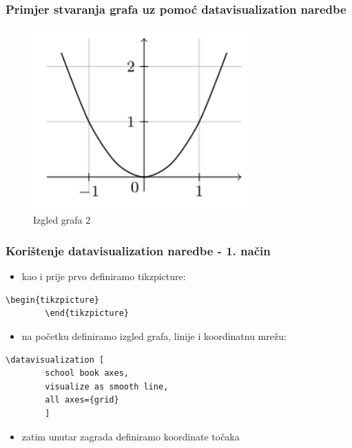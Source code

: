 \documentclass{beamer}
\begin{document}
	\begin{frame}
	\frametitle{Primjer stvaranja grafa uz pomoć datavisualization naredbe}
		\begin{figure}
			\begin{center}
				\includegraphics[width=12 cm,height=7cm]{graf_2.png}
				\caption{Izgled grafa 2}
			\end{center}
		\end{figure}
	\end{frame}

\begin{frame}[fragile]
	\frametitle{Korištenje datavisualization naredbe - 1. način}
		\begin{itemize}
			\item kao i prije prvo definiramo tikzpicture:
		\end{itemize} 
		\begin{verbatim}\begin{tikzpicture}
		\end{tikzpicture}
		\end{verbatim}
		\begin{itemize}
			\item na početku definiramo izgled grafa, linije i koordinatnu mrežu:
		\end{itemize}
		\begin{verbatim}\datavisualization [
		school book axes, 
		visualize as smooth line,
		all axes={grid}
		]\end{verbatim}
		\begin{itemize}
			\item zatim unutar zagrada definiramo koordinate točaka
		\end{itemize}
\end{frame}
\end{document}
